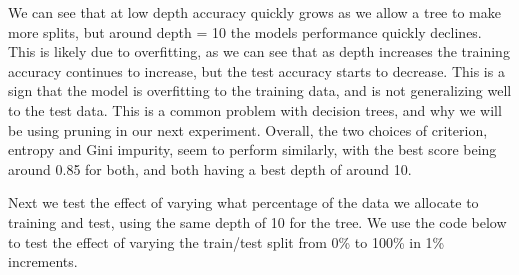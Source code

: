 \documentclass[
  letterpaper,
  DIV=11,
  numbers=noendperiod]{scrartcl}
\begin{document}
We can see that at low depth accuracy quickly grows as we allow a tree
to make more splits, but around depth = 10 the models performance
quickly declines. This is likely due to overfitting, as we can see that
as depth increases the training accuracy continues to increase, but the
test accuracy starts to decrease. This is a sign that the model is
overfitting to the training data, and is not generalizing well to the
test data. This is a common problem with decision trees, and why we will
be using pruning in our next experiment. Overall, the two choices of
criterion, entropy and Gini impurity, seem to perform similarly, with
the best score being around 0.85 for both, and both having a best depth
of around 10.

Next we test the effect of varying what percentage of the data we
allocate to training and test, using the same depth of 10 for the tree.
We use the code below to test the effect of varying the train/test split
from 0\% to 100\% in 1\% increments.
\end{document}
